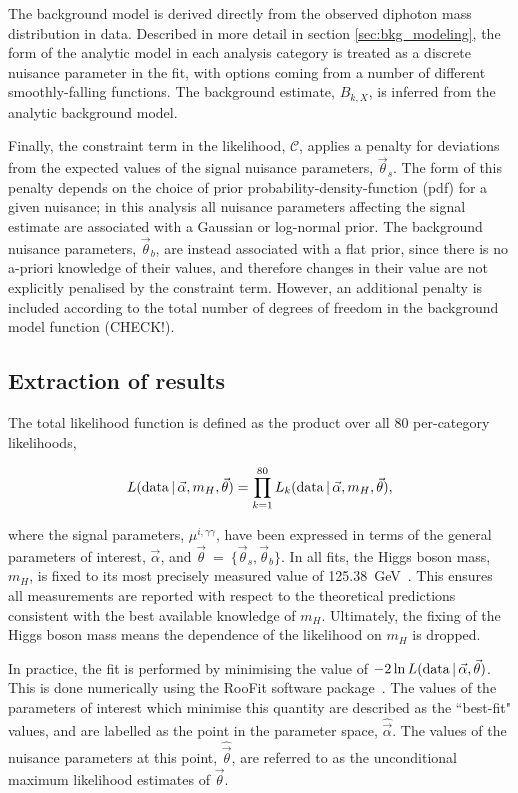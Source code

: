 The background model is derived directly from the observed diphoton mass distribution in data. Described in more detail in section \ref{sec:bkg_modeling}, the form of the analytic model in each analysis category is treated as a discrete nuisance parameter in the fit, with options coming from a number of different smoothly-falling functions. The background estimate, $B_{k,X}$, is inferred from the analytic background model.

Finally, the constraint term in the likelihood, $\mathcal{C}$, applies a penalty for deviations from the expected values of the signal nuisance parameters, $\vec{\theta}_s$. The form of this penalty depends on the choice of prior probability-density-function (pdf) for a given nuisance; in this analysis all nuisance parameters affecting the signal estimate are associated with a Gaussian or log-normal prior. The background nuisance parameters, $\vec{\theta}_b$, are instead associated with a flat prior, since there is no a-priori knowledge of their values, and therefore changes in their value are not explicitly penalised by the constraint term. However, an additional penalty is included according to the total number of degrees of freedom in the background model function (CHECK!). 

\subsection{Extraction of results}\label{sec:results_extraction}
The total likelihood function is defined as the product over all 80 per-category likelihoods,

\begin{equation}
    L({\rm{data}}\,|\,\vec{\alpha},m_H,\vec{\theta}) = \prod_{k=1}^{80}  L_k({\rm{data}}\,|\,\vec{\alpha},m_H,\vec{\theta}),
\end{equation}

\noindent
where the signal parameters, $\mu^{i,\gamma\gamma}$, have been expressed in terms of the general parameters of interest, $\vec{\alpha}$, and $\vec{\theta}$~=~$\{\vec{\theta}_s,\vec{\theta}_b\}$. In all fits, the Higgs boson mass, $m_H$, is fixed to its most precisely measured value of 125.38~GeV~\cite{Sirunyan:2020xwk}. This ensures all measurements are reported with respect to the theoretical predictions consistent with the best available knowledge of $m_H$. Ultimately, the fixing of the Higgs boson mass means the dependence of the likelihood on $m_H$ is dropped.

In practice, the fit is performed by minimising the value of $-2 \ln L({\rm{data}}\,|\,\vec{\alpha},\vec{\theta})$. This is done numerically using the RooFit software package~\cite{Verkerke:2003ir}. The values of the parameters of interest which minimise this quantity are described as the ``best-fit" values, and are labelled as the point in the parameter space, $\hat{\vec{\alpha}}$. The values of the nuisance parameters at this point, $\hat{\vec{\theta}}$, are referred to as the unconditional maximum likelihood estimates of $\vec{\theta}$. 

